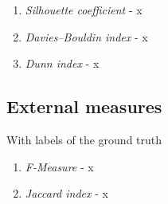     \begin{enumerate}
      \item \emph{Silhouette coefficient} - x
      \item \emph{Davies–Bouldin index} - x
      \item \emph{Dunn index} - x
    \end{enumerate}

  \subsection{External measures}
    With labels of the ground truth

    \begin{enumerate}
      \item \emph{F-Measure} - x
      \item \emph{Jaccard index} - x
    \end{enumerate}

